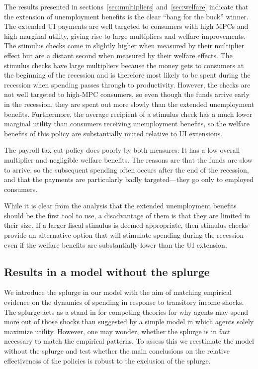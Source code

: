 \documentclass[\econtexRoot/HAFiscal]{subfiles}
\begin{document}
The results presented in sections~\ref{sec:multipliers} and~\ref{sec:welfare} indicate that the extension of unemployment benefits is the clear ``bang for the buck'' winner. The extended UI payments are well targeted to consumers with high MPCs and high marginal utility, giving rise to large multipliers and welfare improvements. The stimulus checks come in slightly higher when measured by their multiplier effect but are a distant second when measured by their welfare effects. The stimulus checks have large multipliers because the money gets to consumers at the beginning of the recession and is therefore most likely to be spent during the recession when spending passes through to productivity.  However, the checks are not well targeted to high-MPC consumers, so even though the funds arrive early in the recession, they are spent out more slowly than the extended unemployment benefits. Furthermore, the average recipient of a stimulus check has a much lower marginal utility than consumers receiving unemployment benefits, so the welfare benefits of this policy are substantially muted relative to UI extensions.

The payroll tax cut policy does poorly by both measures: It has a low overall multiplier and negligible welfare benefits. The reasons are that the funds are slow to arrive, so the subsequent spending often occurs after the end of the recession, and that the payments are particularly badly targeted---they go only to employed consumers.

While it is clear from the analysis that the extended unemployment benefits should be the first tool to use, a disadvantage of them is that they are limited in their size. If a larger fiscal stimulus is deemed appropriate, then stimulus checks provide an alternative option that will stimulate spending during the recession even if the welfare benefits are substantially lower than the UI extension.


\FloatBarrier
\hypertarget{Model_without_splurge}{}\par\subsection{Results in a model without the splurge} 

We introduce the splurge in our model with the aim of matching empirical evidence on the dynamics of spending in response to transitory income shocks. The splurge acts as a stand-in for competing theories for why agents may spend more out of those shocks than suggested by a simple model in which agents solely maximize utility. However, one may wonder, whether the splurge is in fact necessary to match the empirical patterns. To assess this we reestimate the model without the splurge and test whether the main conclusions on the relative effectiveness of the policies is robust to the exclusion of the splurge. 
\end{document}
